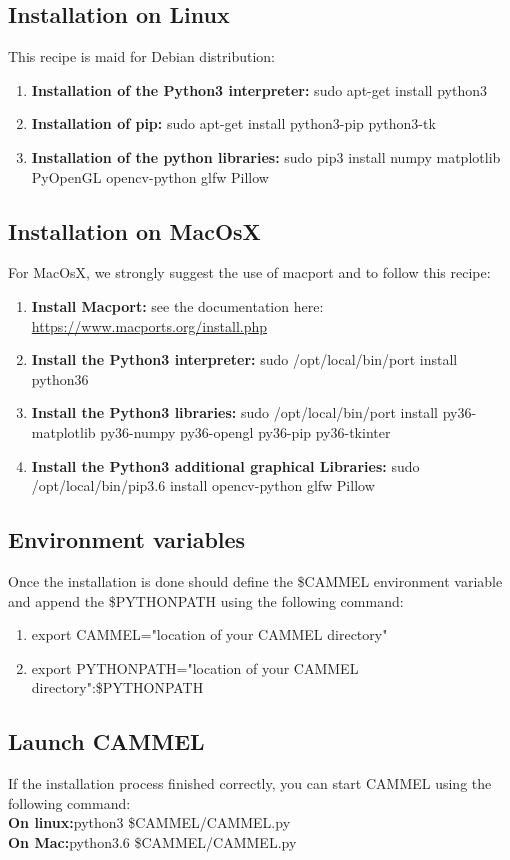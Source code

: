\documentclass[12pt,a4paper]{article}
\begin{document}
\subsection{Installation on Linux}
This recipe is maid for Debian distribution:
\begin{enumerate}
\item{\textbf{Installation of the Python3 interpreter:} sudo apt-get install python3}
\item{\textbf{Installation of pip:} sudo apt-get install python3-pip python3-tk}
\item{\textbf{Installation of the python libraries:} sudo pip3 install numpy matplotlib PyOpenGL opencv-python glfw Pillow}
\end{enumerate}

\subsection{Installation on MacOsX}
For MacOsX, we strongly suggest the use of macport and to follow this recipe:
\begin{enumerate}
\item{\textbf{Install Macport:} see the documentation here: \href{https://www.macports.org/install.php}{https://www.macports.org/install.php}}
\item{\textbf{Install the Python3 interpreter:} sudo /opt/local/bin/port install python36}
\item{\textbf{Install the Python3 libraries:} sudo /opt/local/bin/port install py36-matplotlib py36-numpy py36-opengl py36-pip py36-tkinter}
\item{\textbf{Install the Python3 additional graphical Libraries:} sudo /opt/local/bin/pip3.6 install opencv-python glfw Pillow}
\end{enumerate}

\subsection{Environment variables}
Once the installation is done should define the \$CAMMEL environment variable and append the \$PYTHONPATH using the following command:
\begin{enumerate}
\item{export CAMMEL="location of your CAMMEL directory"}
\item{export PYTHONPATH="location of your CAMMEL directory":\$PYTHONPATH}
\end{enumerate}

\subsection{Launch CAMMEL}
If the installation process finished correctly, you can start CAMMEL using the following command:\\
\textbf{On linux:}python3 \$CAMMEL/CAMMEL.py \\
\textbf{On Mac:}python3.6 \$CAMMEL/CAMMEL.py
\end{document}
